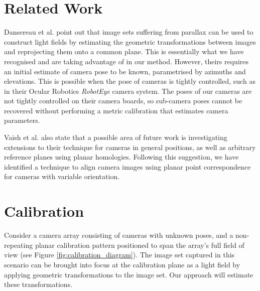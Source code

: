 \documentclass{article} \usepackage{acra}
\begin{document}
\section{Related Work}

Dansereau et al.  point out that image sets
suffering from parallax can be used to construct light fields by estimating the
geometric transformations between images and reprojecting them onto a common
plane. This is essentially what we have recognised and are taking advantage of
in our method. However, theirs requires an initial estimate of camera pose to be
known, parametrised by azimuths and elevations. This is possible when the pose
of cameras is tightly controlled, such as in their Ocular Robotics
\emph{RobotEye} camera system. The poses of our cameras are not tightly
controlled on their camera boards, so sub-camera poses cannot be recovered
without performing a metric calibration that estimates camera parameters.

Vaish et al.  also state that a possible area of
future work is investigating extensions to their technique for cameras in
general positions, as well as arbitrary reference planes using planar
homologies. Following this suggestion, we have identified a technique to align
camera images using planar point correspondence for cameras with variable
orientation.

\section{Calibration}

Consider a camera array consisting of cameras with unknown poses, and a
non-repeating planar calibration pattern positioned to span the array's full
field of view (see Figure \ref{fig:calibration_diagram}). The image set captured
in this scenario can be brought into focus at the calibration plane as a light
field by applying geometric transformations to the image set. Our approach will
estimate these transformations.
\end{document}
